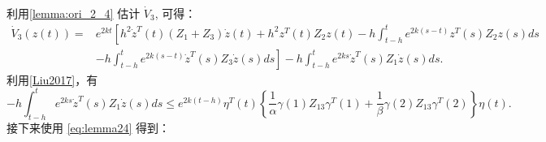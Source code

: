 \documentclass[a4paper, 12pt, oneside]{article}
\theoremstyle{cn_theorem}
\begin{document}
利用\cref{lemma:ori_2_4} 估计 $\dot{V}_3$, 可得：
\begin{align*}
    \dot{V}_3(z(t)) =& e^{2kt} \left[ h^2 \dot{z}^T(t)(Z_1+Z_3)\dot{z}(t) + h^2 z^T(t) Z_2 z(t) - h \int_{t-h}^t e^{2k(s-t)} z^T(s) Z_2 z(s) ds \right. \\
                     & \left. - h \int_{t-h}^t e^{2k(s-t)} \dot{z}^T(s) Z_3 \dot{z}(s) ds \right] - h \int_{t-h}^t e^{2ks} \dot{z}^T(s) Z_1 \dot{z}(s) ds.
\end{align*}
利用\cref{Liu2017}，有
\begin{equation*}
    -h \int_{t-h}^t e^{2ks} \dot{z}^T(s) Z_1 \dot{z}(s) ds \le e^{2k(t-h)} \eta^T(t) \left\{ \frac{1}{\alpha}\gamma(1) Z_{13} \gamma^T(1) + \frac{1}{\beta}\gamma(2) Z_{13} \gamma^T(2) \right\} \eta(t).
\end{equation*}
接下来使用 \eqref{eq:lemma24} 得到：
\end{document}
